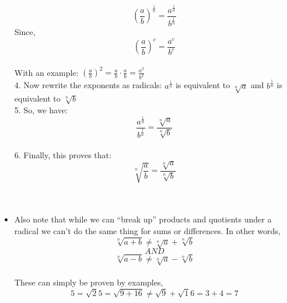 \begin{itemize}
$$ \left(\frac{a}{b}\right)^{\frac{1}{n}} = \frac{a^{\frac{1}{n}}}{b^{\frac{1}{n}}} $$ Since, \\
$$ (\frac{a}{b})^c = \frac{a^c}{b^c} $$ \\
With an example: $ (\frac{a}{b})^2 = \frac{a}{b} \cdot \frac{a}{b} = \frac{a^2}{b^2} $ \\
	4. Now rewrite the exponents as radicals: $ a^{\frac{1}{n}} $ is equivalent to $ \sqrt[n]{a} $ and  $b^{\frac{1}{n}}$ is equivalent to $ \sqrt[n]{b} $ \\
	5. So, we have: 
	$$ \frac{a^{\frac{1}{n}}}{b^{\frac{1}{n}}} = \frac{\sqrt[n]{a}}{\sqrt[n]{b}} $$ \\
	6. Finally, this proves that: 
	$$ \sqrt[n]{\frac{a}{b}} = \frac{\sqrt[n]{a}}{\sqrt[n]{b}} $$ \\
	\\
	
	\item Also note that while we can “break up” products and quotients under a radical we can’t do the same thing for sums or differences. In other words,
	$$ \sqrt[n]{a+b} \neq \sqrt[n]{a}+ \sqrt[n]{b}  $$ 
	$$ AND $$
	$$ \sqrt[n]{a-b} \neq \sqrt[n]{a}- \sqrt[n]{b} $$ \\
These can simply be proven by examples, 
$$ 5 = \sqrt25 = \sqrt{9+16} \neq \sqrt9 + \sqrt16 = 3+4 = 7 $$

\end{itemize}